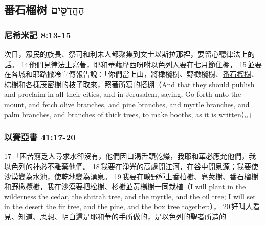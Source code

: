 






































\subsection{番石榴树  הַהֲדַסִּ֖ים }
\subsubsection{尼希米記 8:13-15}
次日，眾民的族長、祭司和利未人都聚集到文士以斯拉那裡，要留心聽律法上的話。 14 他們見律法上寫著，耶和華藉摩西吩咐以色列人要在七月節住棚， 15 並要在各城和耶路撒冷宣傳報告說：「你們當上山，將橄欖樹、野橄欖樹、\underline{番石榴樹}、棕樹和各樣茂密樹的枝子取來，照著所寫的搭棚（And that they should publish and proclaim in all their cities, and in Jerusalem, saying, Go forth unto the mount, and fetch olive branches, and pine branches, and myrtle branches, and palm branches, and branches of thick trees, to make booths, as it is written）。」

\subsubsection{以賽亞書 41:17-20}
17 「困苦窮乏人尋求水卻沒有，他們因口渴舌頭乾燥，我耶和華必應允他們，我以色列的神必不離棄他們。 18 我要在淨光的高處開江河，在谷中開泉源；我要使沙漠變為水池，使乾地變為湧泉。 19 我要在曠野種上香柏樹、皂莢樹、\underline{番石榴樹}和野橄欖樹，我在沙漠要把松樹、杉樹並黃楊樹一同栽植（I will plant in the wilderness the cedar, the shittah tree, and the myrtle, and the oil tree; I will set in the desert the fir tree, and the pine, and the box tree together:）， 20 好叫人看見、知道、思想、明白這是耶和華的手所做的，是以色列的聖者所造的

